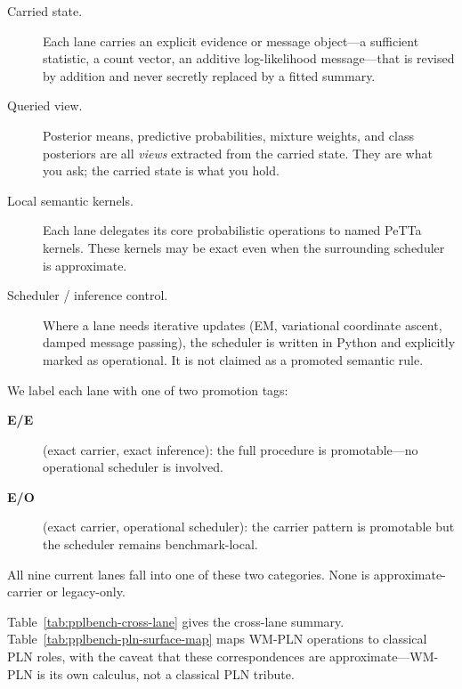 \documentclass[11pt,openany]{report}
\begin{document}
\begin{description}
\item[Carried state.]
  Each lane carries an explicit evidence or message object---a sufficient
  statistic, a count vector, an additive log-likelihood message---that is
  revised by addition and never secretly replaced by a fitted summary.

\item[Queried view.]
  Posterior means, predictive probabilities, mixture weights, and class
  posteriors are all \emph{views} extracted from the carried state.
  They are what you ask; the carried state is what you hold.

\item[Local semantic kernels.]
  Each lane delegates its core probabilistic operations to named PeTTa
  kernels.  These kernels may be exact even when the surrounding scheduler
  is approximate.

\item[Scheduler / inference control.]
  Where a lane needs iterative updates (EM, variational coordinate ascent,
  damped message passing), the scheduler is written in Python and explicitly
  marked as operational.  It is not claimed as a promoted semantic rule.
\end{description}

\noindent
We label each lane with one of two promotion tags:
\begin{description}
\item[\textbf{E/E}] (exact carrier, exact inference):
  the full procedure is promotable---no operational scheduler is involved.
\item[\textbf{E/O}] (exact carrier, operational scheduler):
  the carrier pattern is promotable but the scheduler remains
  benchmark-local.
\end{description}
All nine current lanes fall into one of these two categories.  None is
approximate-carrier or legacy-only.

Table~\ref{tab:pplbench-cross-lane} gives the cross-lane summary.
Table~\ref{tab:pplbench-pln-surface-map} maps WM-PLN operations to
classical PLN roles, with the caveat that these correspondences are
approximate---WM-PLN is its own calculus, not a classical PLN tribute.
\end{document}

